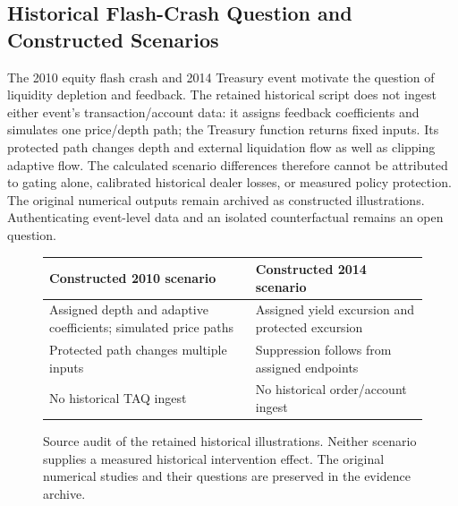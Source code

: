 \subsection{Historical Flash-Crash Question and Constructed Scenarios}
\label{sec:historical_flash_crashes}
The 2010 equity flash crash and 2014 Treasury event motivate the question of liquidity depletion and feedback. The retained historical script does not ingest either event's transaction/account data: it assigns feedback coefficients and simulates one price/depth path; the Treasury function returns fixed inputs. Its protected path changes depth and external liquidation flow as well as clipping adaptive flow. The calculated scenario differences therefore cannot be attributed to gating alone, calibrated historical dealer losses, or measured policy protection. The original numerical outputs remain archived as constructed illustrations. Authenticating event-level data and an isolated counterfactual remains an open question.
\begin{figure}[htbp]\centering
\begin{tabularx}{\textwidth}{XX}\toprule
Constructed 2010 scenario & Constructed 2014 scenario \\\midrule
Assigned depth and adaptive coefficients; simulated price paths & Assigned yield excursion and protected excursion \\
Protected path changes multiple inputs & Suppression follows from assigned endpoints \\
No historical TAQ ingest & No historical order/account ingest \\\bottomrule\end{tabularx}
\caption{Source audit of the retained historical illustrations. Neither scenario supplies a measured historical intervention effect. The original numerical studies and their questions are preserved in the evidence archive.}
\label{fig:equity_flash_crash_taq}\end{figure}

